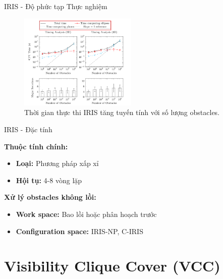 \documentclass[aspectratio=169]{beamer}
\begin{document}
\begin{frame}{IRIS - Độ phức tạp Thực nghiệm}
    \begin{figure}
        \centering
        \includegraphics[width=0.5\textwidth]{../imgs/time-iris.png}
        \caption{\small Thời gian thực thi IRIS tăng tuyến tính với số lượng obstacles.}
    \end{figure}
\end{frame}


\begin{frame}{IRIS - Đặc tính}

    \textbf{Thuộc tính chính:}
    \begin{itemize}
        \item \textbf{Loại:} Phương pháp xấp xỉ
        \item \textbf{Hội tụ:} 4-8 vòng lặp
    \end{itemize}

    \vspace{1em}
    \textbf{Xử lý obstacles không lồi:}
    \begin{itemize}
        \item \textbf{Work space:} Bao lồi hoặc phân hoạch trước
        \item \textbf{Configuration space:} IRIS-NP, C-IRIS
    \end{itemize}

\end{frame}

\section{Visibility Clique Cover (VCC)}
\end{document}
